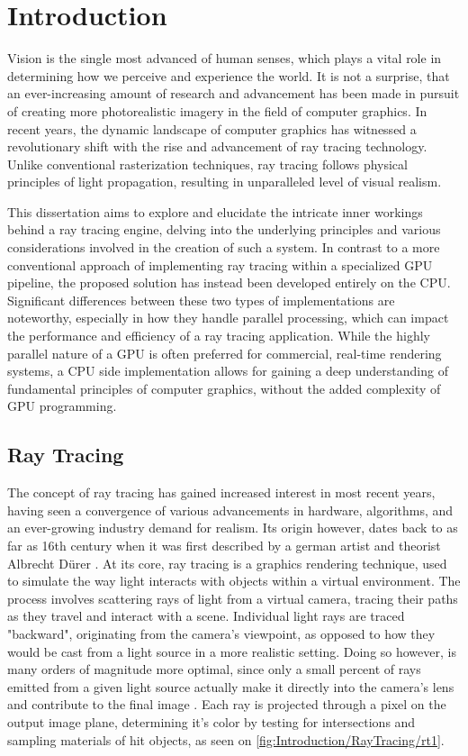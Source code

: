 \chapter{Introduction} \label{ch:Introduction}

Vision is the single most advanced of human senses, which plays a vital role in determining how we perceive and experience the world.
It is not a surprise, that an ever-increasing amount of research and advancement has been made in pursuit of creating more photorealistic imagery in the field of computer graphics. 
In recent years, the dynamic landscape of computer graphics has witnessed a revolutionary shift with the rise and advancement of ray tracing technology. 
Unlike conventional rasterization techniques, ray tracing follows physical principles of light propagation, resulting in unparalleled level of visual realism. 

This dissertation aims to explore and elucidate the intricate inner workings behind a ray tracing engine, delving into the underlying principles and various considerations involved in the creation of such a system.
In contrast to a more conventional approach of implementing ray tracing within a specialized GPU pipeline, the proposed solution has instead been developed entirely on the CPU. 
Significant differences between these two types of implementations are noteworthy, especially in how they handle parallel processing, which can impact the performance and efficiency of a ray tracing application. 
While the highly parallel nature of a GPU is often preferred for commercial, real-time rendering systems, a CPU side implementation allows for gaining a deep understanding of fundamental principles of computer graphics, without the added complexity of GPU programming.

\section{Ray Tracing}

The concept of ray tracing has gained increased interest in most recent years, having seen a convergence of various advancements in hardware, algorithms, and an ever-growing industry demand for realism.
Its origin however, dates back to as far as 16th century when it was first described by a german artist and theorist Albrecht Dürer \supercite{Hofmann1990}.
At its core, ray tracing is a graphics rendering technique, used to simulate the way light interacts with objects within a virtual environment. 
The process involves scattering rays of light from a virtual camera, tracing their paths as they travel and interact with a scene. 
Individual light rays are traced "backward", originating from the camera's viewpoint, as opposed to how they would be cast from a light source in a more realistic setting.
Doing so however, is many orders of magnitude more optimal, since only a small percent of rays emitted from a given light source actually make it directly into the camera's lens and contribute to the final image \supercite{Glassner1989}.
Each ray is projected through a pixel on the output image plane, determining it's color by testing for intersections and sampling materials of hit objects, as seen on \cref{fig:Introduction/RayTracing/rt1}. 

